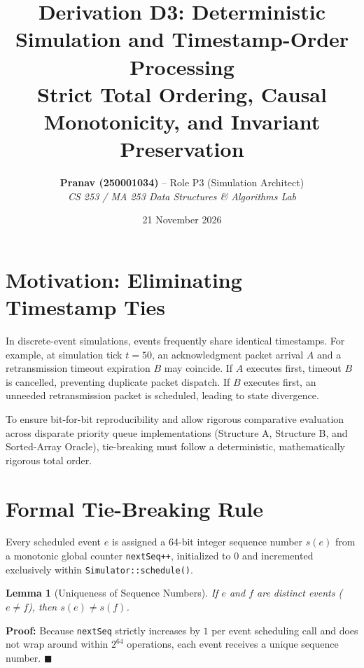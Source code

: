 \documentclass[11pt,a4paper]{article}
\title{\textbf{Derivation D3: Deterministic Simulation and Timestamp-Order Processing}\\
\large Strict Total Ordering, Causal Monotonicity, and Invariant Preservation}
\author{\textbf{Pranav (250001034)} -- Role P3 (Simulation Architect)\\
\textit{CS 253 / MA 253 Data Structures \& Algorithms Lab}}
\date{21 November 2026}
\newtheorem{lemma}{Lemma}
\newenvironment{proof}{\noindent\textbf{Proof:}\enspace}{\hfill$\blacksquare$\par\medskip}
\begin{document}
\maketitle

\section{Motivation: Eliminating Timestamp Ties}
In discrete-event simulations, events frequently share identical timestamps. For example, at simulation tick $t = 50$, an acknowledgment packet arrival $A$ and a retransmission timeout expiration $B$ may coincide. If $A$ executes first, timeout $B$ is cancelled, preventing duplicate packet dispatch. If $B$ executes first, an unneeded retransmission packet is scheduled, leading to state divergence.

To ensure bit-for-bit reproducibility and allow rigorous comparative evaluation across disparate priority queue implementations (Structure A, Structure B, and Sorted-Array Oracle), tie-breaking must follow a deterministic, mathematically rigorous total order.

\section{Formal Tie-Breaking Rule}
Every scheduled event $e$ is assigned a 64-bit integer sequence number $s(e)$ from a monotonic global counter \texttt{nextSeq++}, initialized to $0$ and incremented exclusively within \texttt{Simulator::schedule()}.

\noindent{}
\vspace{0.8em}

\begin{lemma}[Uniqueness of Sequence Numbers]
If $e$ and $f$ are distinct events ($e \ne f$), then $s(e) \ne s(f)$.
\end{lemma}
\begin{proof}
Because \texttt{nextSeq} strictly increases by $1$ per event scheduling call and does not wrap around within $2^{64}$ operations, each event receives a unique sequence number.
\end{proof}
\end{document}
